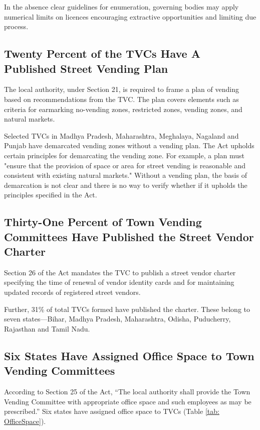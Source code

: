 \documentclass[a4paper, 12pt, twoside]{article}
\begin{document}
{	In the absence clear guidelines for enumeration, governing bodies may apply numerical limits on licences encouraging extractive opportunities and limiting due process.

\subsection*{Twenty Percent of the TVCs Have A Published Street Vending Plan}
	The local authority, under Section 21, is required to frame a plan of vending based on recommendations from the TVC. The plan covers elements such as criteria for earmarking no-vending zones, restricted zones, vending zones, and natural markets.

	Selected TVCs in Madhya Pradesh, Maharashtra, Meghalaya, Nagaland and Punjab have demarcated vending zones without a vending plan. The Act upholds certain principles for demarcating the vending zone. For example, a plan must "ensure that the provision of space or area for street vending is reasonable and consistent with existing natural markets." Without a vending plan, the basis of demarcation is not clear and there is no way to verify whether if it upholds the principles specified in the Act.

\subsection*{Thirty-One Percent of Town Vending Committees Have Published the Street Vendor Charter}
	Section 26 of the Act mandates the TVC to publish a street vendor charter specifying the time of renewal of vendor identity cards and for maintaining updated records of registered street vendors.

	Further, 31\% of total TVCs formed have published the charter. These belong to seven states—Bihar, Madhya Pradesh, Maharashtra, Odisha, Puducherry, Rajasthan and Tamil Nadu.

\subsection*{Six States Have Assigned Office Space to Town Vending Committees}
	According to Section 25 of the Act, “The local authority shall provide the Town Vending Committee with appropriate office space and such employees as may be prescribed.” Six states have assigned office space to TVCs (Table \ref{tab: OfficeSpace}).


}
\end{document}
